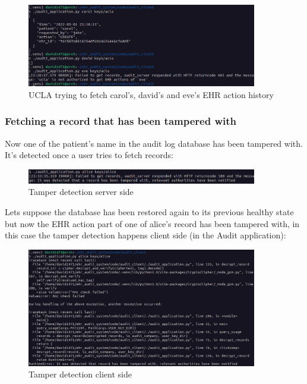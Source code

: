 \documentclass[11pt]{article}
\begin{document}
\begin{flushleft}
\begin{figure}[h!]
\begin{center}
	\includegraphics[width = 380px]{images/ucla_fetch_requests.png}
	\caption{UCLA trying to fetch carol's, david's and eve's EHR action history}
\end{center}
\end{figure}

\subsubsection{Fetching a record that has been tampered with}

Now one of the patient's name in the audit log database has been tampered with. It's detected once a user tries to fetch records:

\begin{figure}[h!]
	\begin{center}
		\includegraphics[width = 380px]{images/tamper_detection_server_side.png}
		\caption{Tamper detection server side}
	\end{center}
\end{figure}

Lets suppose the database has been restored again to its previous healthy state but now the EHR action part of one of alice's record has been tampered with, in this case the tamper detection happens client side (in the Audit application):

\begin{figure}[h!]
	\begin{center}
		\includegraphics[width = 380px]{images/tamper_detection_client_side.png}
		\caption{Tamper detection client side}
	\end{center}
\end{figure}


\end{flushleft}
\end{document}
